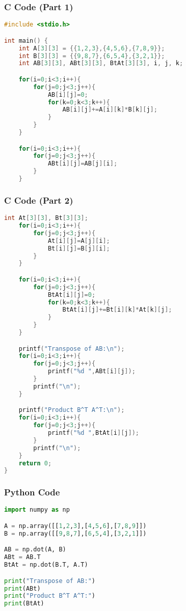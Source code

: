 \documentclass{beamer}
\begin{document}
\begin{frame}[fragile]
\frametitle{C Code (Part 1)}
\begin{lstlisting}[language=C]
#include <stdio.h>

int main() {
    int A[3][3] = {{1,2,3},{4,5,6},{7,8,9}};
    int B[3][3] = {{9,8,7},{6,5,4},{3,2,1}};
    int AB[3][3], ABt[3][3], BtAt[3][3], i, j, k;

    for(i=0;i<3;i++){
        for(j=0;j<3;j++){
            AB[i][j]=0;
            for(k=0;k<3;k++){
                AB[i][j]+=A[i][k]*B[k][j];
            }
        }
    }

    for(i=0;i<3;i++){
        for(j=0;j<3;j++){
            ABt[i][j]=AB[j][i];
        }
    }
\end{lstlisting}
\end{frame}

\begin{frame}[fragile]
\frametitle{C Code (Part 2)}
\begin{lstlisting}[language=C]
    int At[3][3], Bt[3][3];
    for(i=0;i<3;i++){
        for(j=0;j<3;j++){
            At[i][j]=A[j][i];
            Bt[i][j]=B[j][i];
        }
    }

    for(i=0;i<3;i++){
        for(j=0;j<3;j++){
            BtAt[i][j]=0;
            for(k=0;k<3;k++){
                BtAt[i][j]+=Bt[i][k]*At[k][j];
            }
        }
    }

    printf("Transpose of AB:\n");
    for(i=0;i<3;i++){
        for(j=0;j<3;j++){
            printf("%d ",ABt[i][j]);
        }
        printf("\n");
    }

    printf("Product B^T A^T:\n");
    for(i=0;i<3;i++){
        for(j=0;j<3;j++){
            printf("%d ",BtAt[i][j]);
        }
        printf("\n");
    }
    return 0;
}
\end{lstlisting}
\end{frame}

\begin{frame}[fragile]
\frametitle{Python Code}
\begin{lstlisting}[language=Python]
import numpy as np

A = np.array([[1,2,3],[4,5,6],[7,8,9]])
B = np.array([[9,8,7],[6,5,4],[3,2,1]])

AB = np.dot(A, B)
ABt = AB.T
BtAt = np.dot(B.T, A.T)

print("Transpose of AB:")
print(ABt)
print("Product B^T A^T:")
print(BtAt)
\end{lstlisting}
\end{frame}
\end{document}
